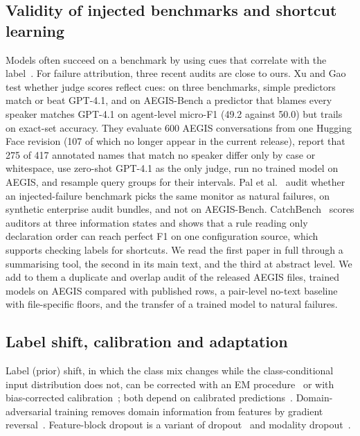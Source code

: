\documentclass[conference]{IEEEtran}
\begin{document}
\subsection{Validity of injected benchmarks and shortcut learning}
Models often succeed on a benchmark by using cues that correlate with the label~\cite{geirhos}. For failure attribution, three recent audits are close to ours. Xu and Gao~\cite{audit2} test whether judge scores reflect cues: on three benchmarks, simple predictors match or beat GPT-4.1, and on AEGIS-Bench a predictor that blames every speaker matches GPT-4.1 on agent-level micro-F1 (49.2 against 50.0) but trails on exact-set accuracy. They evaluate 600 AEGIS conversations from one Hugging Face revision (107 of which no longer appear in the current release), report that 275 of 417 annotated names that match no speaker differ only by case or whitespace, use zero-shot GPT-4.1 as the only judge, run no trained model on AEGIS, and resample query groups for their intervals. Pal et al.~\cite{audit1} audit whether an injected-failure benchmark picks the same monitor as natural failures, on synthetic enterprise audit bundles, and not on AEGIS-Bench. CatchBench~\cite{catch} scores auditors at three information states and shows that a rule reading only declaration order can reach perfect F1 on one configuration source, which supports checking labels for shortcuts. We read the first paper in full through a summarising tool, the second in its main text, and the third at abstract level. We add to them a duplicate and overlap audit of the released AEGIS files, trained models on AEGIS compared with published rows, a pair-level no-text baseline with file-specific floors, and the transfer of a trained model to natural failures.

\subsection{Label shift, calibration and adaptation}
Label (prior) shift, in which the class mix changes while the class-conditional input distribution does not, can be corrected with an EM procedure~\cite{saerens} or with bias-corrected calibration~\cite{alexandari}; both depend on calibrated predictions~\cite{guo}. Domain-adversarial training removes domain information from features by gradient reversal~\cite{ganin}. Feature-block dropout is a variant of dropout~\cite{dropout} and modality dropout~\cite{moddrop}.
\end{document}
